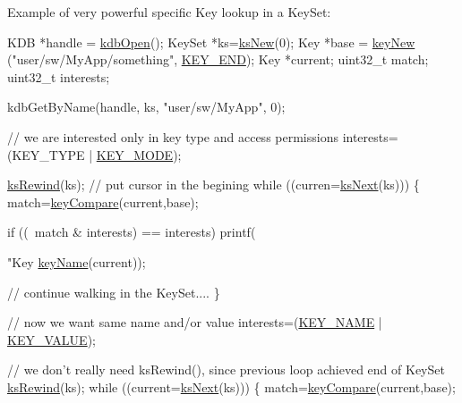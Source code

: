 \begin{DoxyParagraph}{Example of very powerful specific Key lookup in a Key\-Set\-:}

\begin{DoxyCode}
KDB *handle = \hyperlink{group__kdb_ga6808defe5870f328dd17910aacbdc6ca}{kdbOpen}();
KeySet *ks=\hyperlink{group__keyset_ga671e1aaee3ae9dc13b4834a4ddbd2c3c}{ksNew}(0);
Key *base = \hyperlink{group__key_gaf6893c038b3ebee90c73a9ea8356bebf}{keyNew} (\textcolor{stringliteral}{"user/sw/MyApp/something"}, \hyperlink{group__key_gga91fb3178848bd682000958089abbaf40aa8adb6fcb92dec58fb19410eacfdd403}{KEY\_END});
Key *current;
uint32\_t match;
uint32\_t interests;


kdbGetByName(handle, ks, \textcolor{stringliteral}{"user/sw/MyApp"}, 0);

\textcolor{comment}{// we are interested only in key type and access permissions}
interests=(KEY\_TYPE | \hyperlink{group__key_gga91fb3178848bd682000958089abbaf40a1b0a91ff3a855d6993930ebf0abaa518}{KEY\_MODE});

\hyperlink{group__keyset_gabe793ff51f1728e3429c84a8a9086b70}{ksRewind}(ks);   \textcolor{comment}{// put cursor in the begining}
\textcolor{keywordflow}{while} ((curren=\hyperlink{group__keyset_ga317321c9065b5a4b3e33fe1c399bcec9}{ksNext}(ks))) \{
        match=\hyperlink{group__keytest_gab98168409d302fdb65692f6e26f17945}{keyCompare}(current,base);
        
        \textcolor{keywordflow}{if} ((~match & interests) == interests)
                printf(\textcolor{stringliteral}{"Key %
      \hyperlink{group__keyname_ga8e805c726a60da921d3736cda7813513}{keyName}(current));

        \textcolor{comment}{// continue walking in the KeySet....}
\}

\textcolor{comment}{// now we want same name and/or value}
interests=(\hyperlink{group__key_gga91fb3178848bd682000958089abbaf40ad6127fc38f96410bf7c8f6e93b0397da}{KEY\_NAME} | \hyperlink{group__key_gga91fb3178848bd682000958089abbaf40ac66e4a49d09212b79f5754ca6db5bd2e}{KEY\_VALUE});

\textcolor{comment}{// we don't really need ksRewind(), since previous loop achieved end of KeySet}
\hyperlink{group__keyset_gabe793ff51f1728e3429c84a8a9086b70}{ksRewind}(ks);
\textcolor{keywordflow}{while} ((current=\hyperlink{group__keyset_ga317321c9065b5a4b3e33fe1c399bcec9}{ksNext}(ks))) \{
        match=\hyperlink{group__keytest_gab98168409d302fdb65692f6e26f17945}{keyCompare}(current,base);

}
\end{DoxyCode}
\end{DoxyParagraph}
